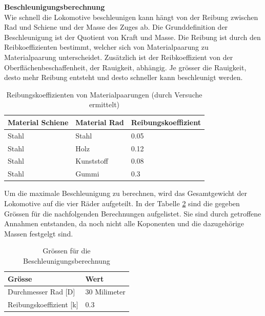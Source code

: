 \documentclass[../../main.tex]{subfiles}
\begin{document}
    \pagebreak

    \textbf{Beschleunigungsberechnung}\\
    Wie schnell die Lokomotive beschleunigen kann hängt von der Reibung zwischen Rad und Schiene und der Masse des Zuges ab. Die Grunddefinition der Beschleunigung ist der Quotient von Kraft und Masse. Die Reibung ist durch den Reibkoeffizienten bestimmt, welcher sich von Materialpaarung zu Materialpaarung unterscheidet. Zusätzlich ist der Reibkoeffizient von der Oberflächenbeschaffenheit, der Rauigkeit, abhängig. Je grösser die Rauigkeit, desto mehr Reibung entsteht und desto schneller kann beschleunigt werden.

    \begin{table}[H] \centering
        \begin{tabular}{|l|l|l|}
        \hline
        \textbf{Material Schiene} & \textbf{Material Rad} & \textbf{Reibungskoeffizient}\\
        \hline
        Stahl                                & Stahl        & 0.05\\
        \hline
        Stahl                                & Holz         & 0.12\\
        \hline
        Stahl                                & Kunststoff   & 0.08\\
        \hline
        Stahl                                & Gummi        & 0.3\\
        \hline
        \end{tabular}

        \caption{Reibungskoeffizienten von Materialpaarungen (durch Versuche ermittelt)}
        \label{tab:com_tiny_pi}
        \end{table}

    Um die maximale Beschleunigung zu berechnen, wird das Gesamtgewicht der Lokomotive auf die vier Räder aufgeteilt. In der Tabelle \ref{tab:groessen_beschleunigung} sind die gegeben Grössen für die nachfolgenden Berechnungen aufgelistet. Sie sind durch getroffene Annahmen entstanden, da noch nicht alle Koponenten und die dazugehörige Massen festgelgt sind.\\

    \begin{table}[H] \centering
        \begin{tabular}{|l|l|}
        \hline
        \textbf{Grösse} & \textbf{Wert}\\
        \hline
        Durchmesser Rad [D]          & 30 Milimeter\\
         \hline
        Reibungskoeffizient [k]      & 0.3\\
        \hline
        \end{tabular}

        \caption{Grössen für die Beschleunigungsberechnung}
        \label{tab:groessen_beschleunigung}
        \end{table}
\end{document}
